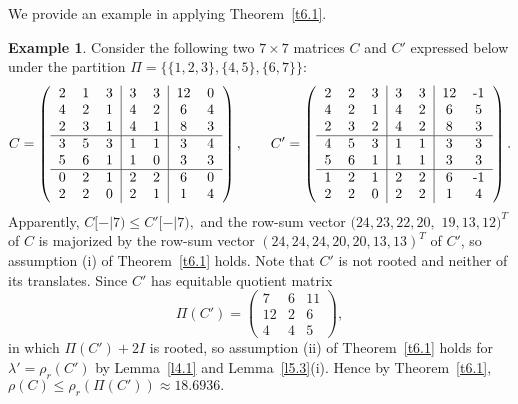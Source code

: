 \documentclass[final,3p, times, 12pt]{elsarticle}
\theoremstyle{plain}
\theoremstyle{definition}
\newtheorem{exam}[thm]{Example}
\theoremstyle{remark}
\numberwithin{equation}{section}
\begin{document}
We provide an example in applying Theorem~\ref{t6.1}.

\begin{exam}\label{exammain}
Consider the following two $7\times 7$ matrices $C$ and $C'$ expressed below under the partition $\Pi=\{\{1, 2, 3\}, \{4, 5\}, \{6, 7\}\}:$
\begin{equation}\label{e8.6}C=\left(
\begin{tabular}{ccc|cc|cc} 2 & 1 & 3 & 3 & 3 & 12 & 0\\ 4 & 2 & 1 & 4 & 2 & 6 & 4\\ 2 & 3 & 1 & 4 & 1 & 8 &3 \\
\hline
3 & 5 & 3 & 1 & 1& 3 & 4\\ 5 & 6 & 1 & 1 & 0 & 3 &3\\
\hline
0 & 2 & 1 & 2 & 2 & 6 & 0\\  2 & 2 & 0 & 2 &1& 1 &4\end{tabular}\right), \qquad
  C'=\left(\begin{tabular}{ccc|cc|cc} 2 & 2 & 3 & 3 & 3 & 12 & -1\\ 4 & 2 & 1 & 4 & 2 & 6 & 5\\ 2 & 3 & 2 & 4 & 2 & 8 & 3 \\ \hline
 4& 5 & 3 & 1 & 1& 3 & 3\\
 5 & 6 & 1 & 1 & 1 & 3 &3\\
 \hline 1 & 2 & 1 & 2 & 2 & 6 & -1\\  2 & 2 & 0 & 2 &2& 1 &4\end{tabular}\right).\end{equation}
Apparently, $C[-|7)\leq C'[-|7),$ and
 the row-sum vector
$(24, 23, 22, 20,$ $19, 13, 12)^T$ of $C$ is majorized by the  row-sum vector $(24, 24, 24, 20, 20, 13, 13)^T$ of $C'$,
so assumption (i)  of Theorem~\ref{t6.1} holds.
Note that $C'$ is not rooted  and neither of its translates.
Since  $C'$ has equitable quotient matrix
$$\Pi(C')=\begin{pmatrix} 7 & 6 & 11 \\ 12 & 2 & 6\\ 4& 4 & 5\end{pmatrix},$$
in which $\Pi(C')+2I$ is rooted, so assumption (ii) of Theorem~\ref{t6.1} holds for $\lambda'=\rho_r(C')$ by Lemma~\ref{l4.1} and Lemma~\ref{l5.3}(i).
Hence by Theorem~\ref{t6.1}, $\rho(C)\leq \rho_r(\Pi(C'))\approx 18.6936.$




\end{exam}
\end{document}
